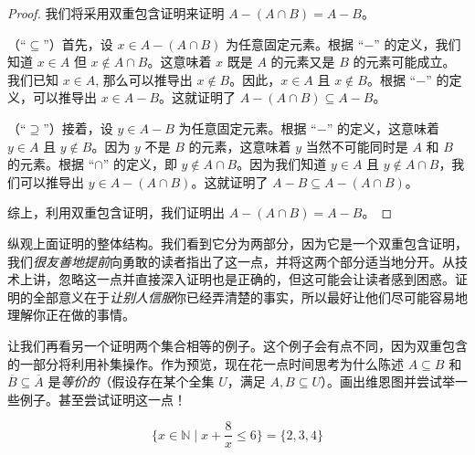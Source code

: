 \begin{proof}
    我们将采用双重包含证明来证明 $A - (A \cap B) = A - B$。

    （``$\subseteq$''）首先，设 $x \in A - (A \cap B)$ 为任意固定元素。根据 ``$-$'' 的定义，我们知道 $x \in A$ 但 $x \notin A \cap B$。这意味着 $x$ 既是 $A$ 的元素又是 $B$ 的元素可能成立。我们已知 $x \in A$, 那么可以推导出 $x \notin B$。因此，$x \in A$ 且 $x \notin B$。根据 ``$-$'' 的定义，可以推导出 $x \in A-B$。这就证明了 $A - (A \cap B) \subseteq A - B$。


    （``$\supseteq$''）接着，设 $y \in A - B$ 为任意固定元素。根据 ``$-$'' 的定义，这意味着 $y \in A$ 且 $y \notin B$。因为 $y$ 不是 $B$ 的元素，这意味着 $y$ 当然不可能同时是 $A$ 和 $B$ 的元素。根据 ``$\cap$'' 的定义，即 $y \notin A \cap B$。因为我们知道 $y \in A$ 且 $y \notin A \cap B$，我们可以推导出 $y \in A - (A \cap B)$。这就证明了 $A - B \subseteq A - (A \cap B)$。

    综上，利用双重包含证明，我们证明出 $A - (A \cap B) = A - B$。
\end{proof}

纵观上面证明的整体结构。我们看到它分为两部分，因为它是一个双重包含证明，我们\emph{很友善地提前}向勇敢的读者指出了这一点，并将这两个部分适当地分开。从技术上讲，忽略这一点并直接深入证明也是正确的，但这可能会让读者感到困惑。证明的全部意义在于\emph{让别人信服}你已经弄清楚的事实，所以最好让他们尽可能容易地理解你正在做的事情。

让我们再看另一个证明两个集合相等的例子。这个例子会有点不同，因为双重包含的一部分将利用补集操作。作为预览，现在花一点时间思考为什么陈述 $A \subseteq B$ 和 $\overline{B} \subseteq \overline{A}$ 是\emph{等价的}（假设存在某个全集 $U$，满足 $A, B \subseteq U$）。画出维恩图并尝试举一些例子。甚至尝试证明这一点！

\begin{proposition}
    \[\Big\{x \in \mathbb{N} \mid x + \frac{8}{x} \le 6\Big\} = \{2, 3, 4\}\]
\end{proposition}

